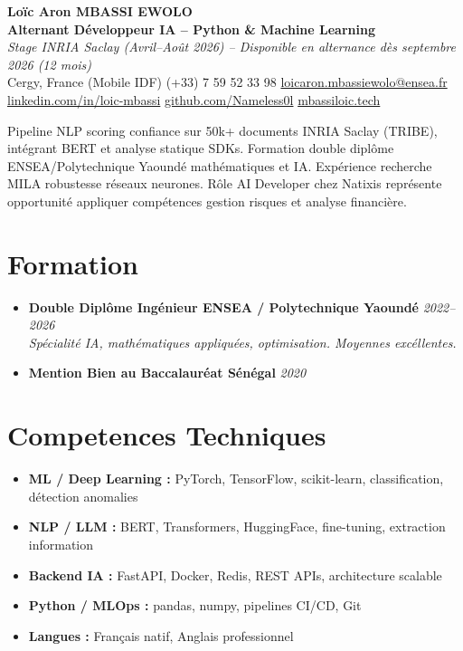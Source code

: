 \documentclass[a4paper,11pt]{article}
\begin{document}
\begin{center}
    {\Large \textbf{Lo\"ic Aron MBASSI EWOLO}} \\ \vspace{4pt}
    \textbf{\large Alternant D\'eveloppeur IA -- Python \& Machine Learning} \\
    \textit{\small Stage INRIA Saclay (Avril--Ao\^ut 2026) -- Disponible en alternance d\`es septembre 2026 (12 mois)} \\ \vspace{4pt}
    \small
    Cergy, France (Mobile IDF) \quad
    (+33) 7 59 52 33 98 \quad
    {\color{primary}\href{mailto:loicaron.mbassiewolo@ensea.fr}{loicaron.mbassiewolo@ensea.fr}} \\ \vspace{2pt}
    {\color{primary}\href{https://www.linkedin.com/in/loic-mbassi/}{linkedin.com/in/loic-mbassi}} \quad
    {\color{primary}\href{https://github.com/Nameless0l}{github.com/Nameless0l}} \quad
    {\color{primary}\href{https://mbassiloic.tech}{mbassiloic.tech}}
\end{center}
\vspace{-6pt}
\noindent\small{Pipeline NLP scoring confiance sur 50k+ documents INRIA Saclay (TRIBE), int\'egrant BERT et analyse statique SDKs. Formation double dipl\^ome ENSEA/Polytechnique Yaound\'e math\'ematiques et IA. Exp\'erience recherche MILA robustesse r\'eseaux neurones. R\^ole AI Developer chez Natixis repr\'esente opportunit\'e appliquer comp\'etences gestion risques et analyse financi\`ere.}

\section{Formation}
\begin{itemize}[leftmargin=0.5cm, nosep]
    \item \textbf{Double Dipl\^ome Ing\'enieur ENSEA / Polytechnique Yaound\'e} \hfill \textit{2022--2026} \\
    \textit{Sp\'ecialit\'e IA, math\'ematiques appliqu\'ees, optimisation. Moyennes exc\'ellentes.}
    \item \textbf{Mention Bien au Baccalaur\'eat S\'en\'egal} \hfill \textit{2020}
\end{itemize}

\section{Competences Techniques}
\begin{itemize}[leftmargin=0.5cm, nosep]
    \item \textbf{ML / Deep Learning :} PyTorch, TensorFlow, scikit-learn, classification, d\'etection anomalies
    \item \textbf{NLP / LLM :} BERT, Transformers, HuggingFace, fine-tuning, extraction information
    \item \textbf{Backend IA :} FastAPI, Docker, Redis, REST APIs, architecture scalable
    \item \textbf{Python / MLOps :} pandas, numpy, pipelines CI/CD, Git
    \item \textbf{Langues :} Fran\c{c}ais natif, Anglais professionnel
\end{itemize}
\end{document}
